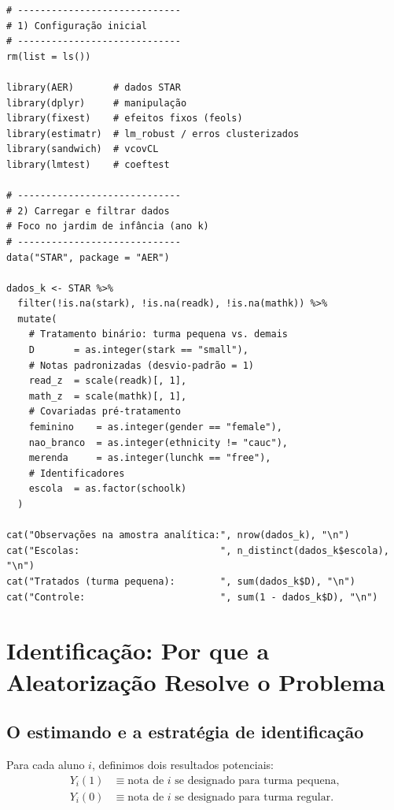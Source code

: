 \begin{lstlisting}[style=Rstyle, caption={Carregamento e preparação dos dados STAR}]
# -----------------------------
# 1) Configuração inicial
# -----------------------------
rm(list = ls())

library(AER)       # dados STAR
library(dplyr)     # manipulação
library(fixest)    # efeitos fixos (feols)
library(estimatr)  # lm_robust / erros clusterizados
library(sandwich)  # vcovCL
library(lmtest)    # coeftest

# -----------------------------
# 2) Carregar e filtrar dados
# Foco no jardim de infância (ano k)
# -----------------------------
data("STAR", package = "AER")

dados_k <- STAR %>%
  filter(!is.na(stark), !is.na(readk), !is.na(mathk)) %>%
  mutate(
    # Tratamento binário: turma pequena vs. demais
    D       = as.integer(stark == "small"),
    # Notas padronizadas (desvio-padrão = 1)
    read_z  = scale(readk)[, 1],
    math_z  = scale(mathk)[, 1],
    # Covariadas pré-tratamento
    feminino    = as.integer(gender == "female"),
    nao_branco  = as.integer(ethnicity != "cauc"),
    merenda     = as.integer(lunchk == "free"),
    # Identificadores
    escola  = as.factor(schoolk)
  )

cat("Observações na amostra analítica:", nrow(dados_k), "\n")
cat("Escolas:                         ", n_distinct(dados_k$escola), "\n")
cat("Tratados (turma pequena):        ", sum(dados_k$D), "\n")
cat("Controle:                        ", sum(1 - dados_k$D), "\n")
\end{lstlisting}


\section{Identificação: Por que a Aleatorização Resolve o Problema}
\label{sec:star_identificacao}

\subsection*{O estimando e a estratégia de identificação}

Para cada aluno $i$, definimos dois resultados potenciais:
\begin{align}
  Y_i(1) &\equiv \text{nota de } i \text{ se designado para turma pequena,} \\
  Y_i(0) &\equiv \text{nota de } i \text{ se designado para turma regular.}
\end{align}

